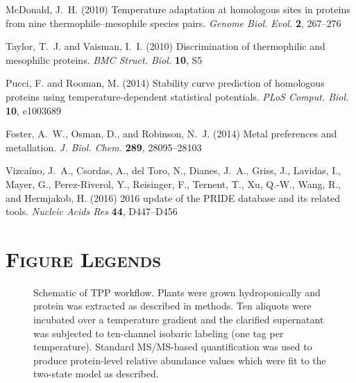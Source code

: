 \documentclass[11pt,letter]{article}\usepackage[]{graphicx}\usepackage[]{color}
\begin{document}
\begin{thebibliography}{}
McDonald, J.~H. (2010) Temperature adaptation at homologous sites in proteins
  from nine thermophile–mesophile species pairs. {\emph{Genome Biol. Evol.}}
  {\bf 2}, 267--276

Taylor, T.~J. and Vaisman, I.~I. (2010) Discrimination of thermophilic and
  mesophilic proteins. {\emph{BMC Struct. Biol.}} {\bf 10}, S5

Pucci, F. and Rooman, M. (2014) Stability curve prediction of homologous
  proteins using temperature-dependent statistical potentials. {\emph{PLoS
  Comput. Biol.}} {\bf 10}, e1003689

Foster, A.~W., Osman, D., and Robinson, N.~J. (2014) Metal preferences and
  metallation. {\emph{J. Biol. Chem.}} {\bf 289}, 28095--28103

Vizcaíno, J.~A., Csordas, A., del Toro, N., Dianes, J.~A., Griss, J., Lavidas,
  I., Mayer, G., Perez-Riverol, Y., Reisinger, F., Ternent, T., Xu, Q.-W.,
  Wang, R., and Hermjakob, H. (2016) 2016 update of the {PRIDE} database and
  its related tools. {\emph{Nucleic Acids Res}} {\bf 44}, D447--D456

\end{thebibliography}


\clearpage
\section*{\textsc{Figure Legends}}

\begin{figure}\centering

\caption{Schematic of TPP workflow. Plants were grown hydroponically and protein
was extracted as described in methods. Ten aliquots were incubated over a
temperature gradient and the clarified supernatant was subjected to ten-channel
isobaric labeling (one tag per temperature). Standard MS/MS-based
quantification was used to produce protein-level relative abundance values
which were fit to the two-state model as described.}

\label{fig:intro}
\end{figure}
\end{document}
